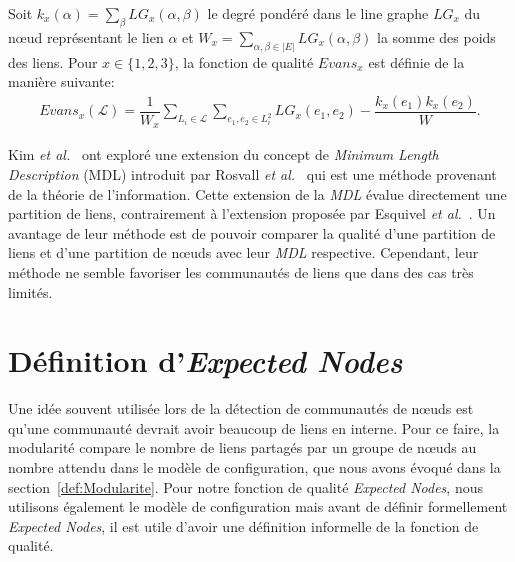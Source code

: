 Soit $k_x(\alpha)= \sum_{\beta}LG_x(\alpha,\beta)$ le degré pondéré dans le line graphe $LG_x$ du n\oe{}ud représentant le lien $\alpha$ et $W_x = \sum_{\alpha,\beta \in |E|}LG_x(\alpha,\beta)$ la somme des poids des liens. Pour $x \in \{1,2,3\}$, la fonction de qualité $Evans_x$ est définie de la manière suivante:
\begin{eqnarray}
Evans_x(\mathcal{L}) = \dfrac{1}{W_x} \sum_{L_i \in \mathcal{L}} \sum_{e_1,e_2 \in L_i^2} LG_x    (e_1,e_2) -  \dfrac{k_x(e_1) k_x(e_2)}{W}.
\end{eqnarray}

Kim \emph{et al.}~\cite{Kim2011} ont exploré une extension du concept de \emph{Minimum Length Description} (MDL) introduit par Rosvall \emph{et al.}~\cite{Rosvall2008} qui est une méthode provenant de la théorie de l'information.
Cette extension de la \emph{MDL} évalue directement une partition de liens, contrairement à l'extension proposée par Esquivel \emph{et al.}~\cite{Esquivel2011}.
Un avantage de leur méthode est de pouvoir comparer la qualité d'une partition de liens et d'une partition de n\oe{}uds avec leur \emph{MDL} respective.
Cependant, leur méthode ne semble favoriser les communautés de liens que dans des cas très limités.


\section{Définition d'\emph{Expected Nodes}}

Une idée souvent utilisée lors de la détection de communautés de n\oe{}uds est qu'une communauté devrait avoir beaucoup de liens en interne.
Pour ce faire, la modularité compare le nombre de liens partagés par un groupe de n\oe{}uds au nombre attendu dans le modèle de configuration, que nous avons évoqué dans la section~\ref{def:Modularite}.
Pour notre fonction de qualité \emph{Expected Nodes}, nous utilisons également le modèle de configuration mais avant de définir formellement \emph{Expected Nodes}, il est utile d'avoir une définition informelle de la fonction de qualité.

